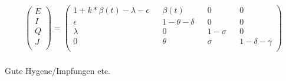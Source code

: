 \documentclass{article}
\begin{document}
\subsubsection{}
\[
    \begin{pmatrix}
    E \\
    I \\
    Q \\
    J \\
    \end{pmatrix}
    =
    \begin{pmatrix}
     1 + k * \beta (t) - \lambda - \epsilon && \beta (t) && 0 && 0\\
     \epsilon &&  1 - \theta - \delta && 0 && 0\\
     \lambda && 0 && 1 - \sigma && 0 \\
     0 &&  \theta && \sigma && 1 - \delta - \gamma \\
    \end{pmatrix}
\]

\subsubsection{}

\subsubsection{}

\subsubsection{}

\subsubsection{}
Gute Hygene/Impfungen etc.

\end{document}

